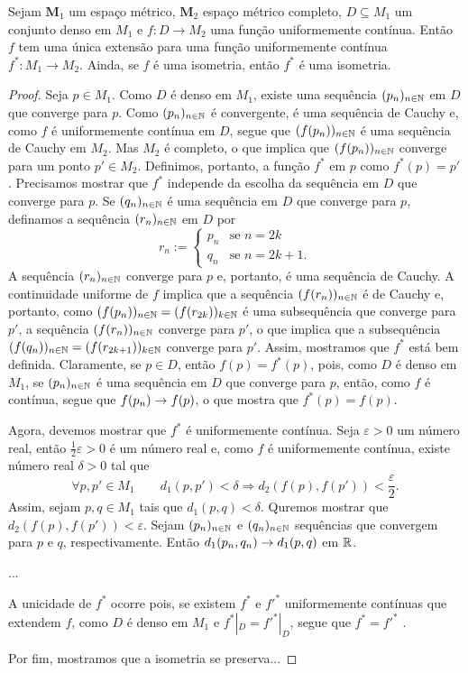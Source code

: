 \begin{theorem}
Sejam $\bm M_1$  um espaço métrico, $\bm M_2$ espaço métrico completo, $D \subseteq M_1$ um conjunto denso em $M_1$ e $f: D \to M_2$ uma função uniformemente contínua. Então $f$ tem uma única extensão para uma função uniformemente contínua $f^*: M_1 \to M_2$. Ainda, se $f$ é uma isometria, então $f^*$ é uma isometria.
\end{theorem}
\begin{proof}
	Seja $p \in M_1$. Como $D$ é denso em $M_1$, existe uma sequência $(p_n)_{n \in \mathbb{N}}$ em $D$ que converge para $p$. Como $(p_n)_{n \in \mathbb{N}}$ é convergente, é uma sequência de Cauchy e, como $f$ é uniformemente contínua em $D$, segue que $(f(p_n))_{n \in \mathbb{N}}$ é uma sequência de Cauchy em $M_2$. Mas $M_2$ é completo, o que implica que $(f(p_n))_{n \in \mathbb{N}}$ converge para um ponto $p' \in M_2$. Definimos, portanto, a função $f^*$ em $p$ como $f^*(p)=p'$. Precisamos mostrar que $f^*$ independe da escolha da sequência em $D$ que converge para $p$. Se $(q_n)_{n \in \mathbb{N}}$ é uma sequência em $D$ que converge para $p$, definamos a sequência $(r_n)_{n \in \mathbb{N}}$ em $D$ por
	\begin{equation*}
	r_n :=
			\begin{cases}
			p_n &\text{se $n=2k$}\\
			q_n &\text{se $n=2k+1$}.
			\end{cases}
	\end{equation*}
A sequência $(r_n)_{n \in \mathbb{N}}$ converge para $p$ e, portanto, é uma sequência de Cauchy. A continuidade uniforme de $f$ implica que a sequência $(f(r_n))_{n \in \mathbb{N}}$ é de Cauchy e, portanto, como $(f(p_n))_{n \in \mathbb{N}}=(f(r_{2k}))_{k \in \mathbb{N}}$ é uma subsequência que converge para $p'$, a sequência $(f(r_n))_{n \in \mathbb{N}}$ converge para $p'$, o que implica que a subsequência $(f(q_n))_{n \in \mathbb{N}}=(f(r_{2k+1}))_{k \in \mathbb{N}}$ converge para $p'$. Assim, mostramos que $f^*$ está bem definida. Claramente, se $p \in D$, então $f(p)=f^*(p)$, pois, como $D$ é denso em $M_1$, se $(p_n)_{n \in \mathbb{N}}$ é uma sequência em $D$ que converge para $p$, então, como $f$ é contínua, segue que $f(p_n) \rightarrow f(p)$, o que mostra que $f^*(p)=f(p)$.

	Agora, devemos mostrar que $f^*$ é uniformemente contínua. Seja $\varepsilon > 0$ um número real, então $\frac{1}{2}\varepsilon > 0$ é um número real e, como $f$ é uniformemente contínua, existe número real $\delta > 0$ tal que
	\begin{equation*}
	\forall p,p' \in M_1 \qquad d_1(p,p') < \delta \Rightarrow d_2(f(p),f(p')) < \frac{\varepsilon}{2}.
	\end{equation*}
Assim, sejam $p,q \in M_1$ tais que $d_1(p,q) < \delta$. Quremos mostrar que $d_2(f(p),f(p')) < \varepsilon$. Sejam $(p_n)_{n \in \mathbb{N}}$ e $(q_n)_{n \in \mathbb{N}}$ sequências que convergem para $p$ e $q$, respectivamente. Então $d_1(p_n,q_n) \rightarrow d_1(p,q)$ em $\mathbb{R}$.

...

	A unicidade de $f^*$ ocorre pois, se existem $f^*$ e $f'^*$ uniformemente contínuas que extendem $f$, como $D$ é denso em $M_1$ e $f^*|_D = f'^*|_D$, segue que $f^* = f'^*$ .
	
	Por fim, mostramos que a isometria se preserva...
\end{proof}


